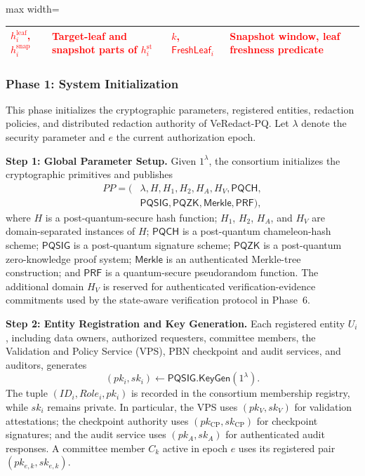 \documentclass[lettersize,journal]{IEEEtran}
\begin{document}
\begin{table}[t]
\begin{adjustbox}{max width=\textwidth}
\begin{tabular}{@{}ll@{\quad}ll@{}}
\textcolor{red}{$h_i^{\mathrm{leaf}}$, $h_i^{\mathrm{snap}}$}
& \textcolor{red}{Target-leaf and snapshot parts of $h_i^{\mathrm{st}}$} &
\textcolor{red}{$k$, $\mathsf{FreshLeaf}_i$}
& \textcolor{red}{Snapshot window, leaf freshness predicate}\\

\hline
\end{tabular}
\end{adjustbox}
\end{table}
    
    \subsubsection*{\textbf{Phase 1: System Initialization}}

This phase initializes the cryptographic parameters, registered
entities, redaction policies, and distributed redaction authority of
VeRedact-PQ. Let $\lambda$ denote the security parameter and $e$ the
current authorization epoch.

\textbf{Step 1: Global Parameter Setup.}
Given $1^\lambda$, the consortium initializes the cryptographic
primitives and publishes
\begin{equation}
\begin{aligned}
PP=(&\lambda,H,H_1,H_2,H_A,H_V,\mathsf{PQCH},\\
&\mathsf{PQSIG},\mathsf{PQZK},\mathsf{Merkle},\mathsf{PRF}),
\end{aligned}
\end{equation}
where $H$ is a post-quantum-secure hash function;
$H_1$, $H_2$, $H_A$, and $H_V$ are domain-separated instances of
$H$; $\mathsf{PQCH}$ is a post-quantum chameleon-hash scheme;
$\mathsf{PQSIG}$ is a post-quantum signature scheme;
$\mathsf{PQZK}$ is a post-quantum zero-knowledge proof system;
$\mathsf{Merkle}$ is an authenticated Merkle-tree construction; and
$\mathsf{PRF}$ is a quantum-secure pseudorandom function.
The additional domain $H_V$ is reserved for authenticated
verification-evidence commitments used by the state-aware verification
protocol in Phase~6.

\textbf{Step 2: Entity Registration and Key Generation.}
Each registered entity $U_i$, including data owners, authorized
requesters, committee members, the Validation and Policy Service
(VPS), PBN checkpoint and audit services, and auditors, generates
\begin{equation}
(pk_i,sk_i)\leftarrow
\mathsf{PQSIG.KeyGen}(1^\lambda).
\end{equation}
The tuple $(ID_i,Role_i,pk_i)$ is recorded in the consortium membership
registry, while $sk_i$ remains private. In particular, the VPS uses
$(pk_V,sk_V)$ for validation attestations; the checkpoint authority uses
$(pk_{\mathrm{CP}},sk_{\mathrm{CP}})$ for checkpoint signatures; and the
audit service uses $(pk_A,sk_A)$ for authenticated audit responses.
A committee member $C_k$ active in epoch $e$ uses its registered pair
$(pk_{e,k},sk_{e,k})$.
\end{document}
